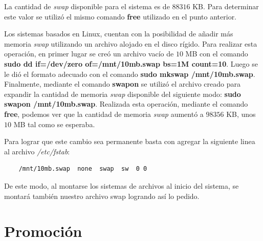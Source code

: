 \documentclass[a4paper,11pt] {article}
\begin{document}
\begin{enumerate}
	La cantidad de \textit{swap} disponible para el sistema es de $88316$ KB. Para determinar este valor se utilizó el mismo comando \textbf{free} utilizado en el punto anterior.

	Los sistemas basados en Linux, cuentan con la posibilidad de añadir más memoria \textit{swap} utilizando un archivo alojado en el disco rígido. Para realizar esta operación, en primer lugar se creó un archivo vacío de $10$ MB con el comando \textbf{sudo dd if=/dev/zero of=/mnt/10mb.swap bs=1M count=10}. Luego se le dió el formato adecuado con el comando \textbf{sudo mkswap /mnt/10mb.swap}. Finalmente, mediante el comando \textbf{swapon} se utilizó el archivo creado para expandir la cantidad de memoria \textit{swap} disponible del siguiente modo: \textbf{sudo swapon /mnt/10mb.swap}. Realizada esta operación, mediante el comando \textbf{free}, podemos ver que la cantidad de memoria \textit{swap} aumentó a $98356$ KB, unos $10$ MB tal como se esperaba.

	Para lograr que este cambio sea permanente basta con agregar la siguiente linea al archivo \textit{/etc/fstab}: 
	\begin{verbatim}
	/mnt/10mb.swap  none  swap  sw  0 0
	\end{verbatim}
	De este modo, al montarse los sistemas de archivos al inicio del sistema, se montará también nuestro archivo swap logrando así lo pedido.
 
\end{enumerate}

\section*{Promoción}
\end{document}
